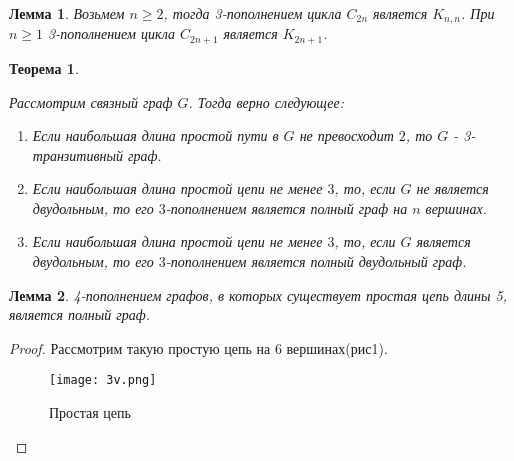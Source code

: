 \documentclass[a4paper,12pt]{article}
\theoremstyle{plain}
\newtheorem{theorem}{Теорема}
\newtheorem{lemma}{Лемма}
\theoremstyle{definition}
\begin{document}
	\begin{lemma}\label{l7}
		{\it Возьмем $n \geq 2 $, тогда 3-пополнением цикла $C_{2n}$ является $K_{n,n}$. При $n \geq 1 $ 3-пополнением цикла $C_{2n+1}$ является $K_{2n+1}$. }
	\end{lemma}
	
	


\begin{theorem}\label{t1}
		{\it Рассмотрим связный граф $G$. Тогда верно следующее:
\begin{enumerate}
\item[1)] Если наибольшая длина простой пути в $G$ не превосходит $2$, то $G$ - 3-транзитивный граф.
\item[2)] Если наибольшая длина простой цепи не менее $3$, то, если $G$ не является двудольным, то его $3$-пополнением является полный граф на $n$ вершинах.
\item[3)] Если наибольшая длина простой цепи не менее $3$, то, если $G$ является двудольным, то его $3$-пополнением является полный двудольный граф.
\end{enumerate}}
	\end{theorem}
	
	
	
	
	
	\begin{lemma}\label{l9}
		{\it 4-пополнением графов, в которых существует простая цепь длины 5, является полный граф.}
	\end{lemma}
	\begin{proof}
	
	Рассмотрим такую простую цепь на 6 вершинах(рис1).
	\ \\
	\begin{figure}[]
	\caption{Простая цепь}
	\texttt{[image: 3v.png]}
	\end{figure}
	

	
	
	\end{proof}
	
\end{document}

